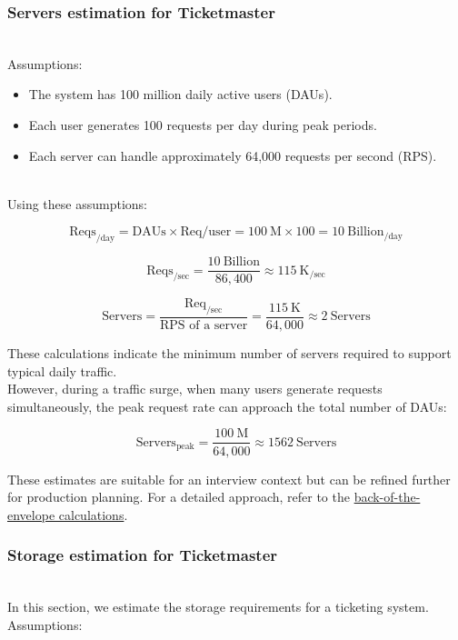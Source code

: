 \subsubsection{Servers estimation for Ticketmaster}\label{1pitbR-9CV8w9toZksbtG}
\\
Assumptions:

\begin{itemize}
\item
\protect{}\label{N6sas92JF96Z4iEidpQP4}
The system has 100 million daily active users (DAUs).
\item
\protect{}\label{K1KyWxJgTI7F_Ycb8Kdjq}
Each user generates 100 requests per day during peak periods.
\item
\protect{}\label{OSVzqvG91UvdNFGZZhCW2}
Each server can handle approximately 64,000 requests per second (RPS).
\end{itemize}
\\
Using these assumptions:

\[
\text{Reqs}_{\text{/day}} = \text{DAUs} \times \text{Req/user} = 100 \ \text{M} \times 100 = 10 \ \text{Billion}_{\text{/day}}
\]

\[
\text{Reqs}_{\text{/sec}} = \frac{10 \ \text{Billion}}{86,400} \approx 115 \ \text{K}_{\text{/sec}}
\]

\[
\text{Servers} = \frac{\text{Req}_{\text{/sec}}}{\text{RPS of a server}} = \frac{115 \ \text{K}}{64,000} \approx 2 \ \text{Servers}
\]

These calculations indicate the minimum number of servers required to support typical daily traffic.
\\
However, during a traffic surge, when many users generate requests simultaneously, the peak request rate can approach the total number of DAUs:

\[
\text{Servers}_{\text{peak}} = \frac{100 \ \text{M}}{64,000} \approx 1562\ \text{Servers}
\]

These estimates are suitable for an interview context but can be refined further for production planning. For a detailed approach, refer to the \href{https://www.educative.io/courses/grokking-the-system-design-interview/put-back-of-the-envelope-numbers-in-perspective}{back-of-the-envelope calculations}.

\subsubsection{Storage estimation for Ticketmaster}\label{2eEw9rL_Z8WW23WbWyDAk}
\\
In this section, we estimate the storage requirements for a ticketing system.
\\
Assumptions:

